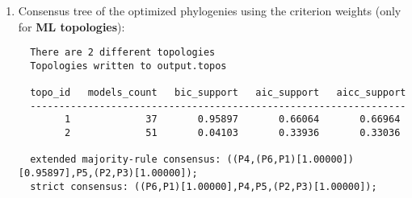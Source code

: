 \begin{enumerate}
\begin{enumerate}
\item Consensus tree of the optimized phylogenies using the criterion weights (only for {\bf ML topologies}):

\begin{lstlisting}
  There are 2 different topologies
  Topologies written to output.topos

  topo_id   models_count   bic_support   aic_support   aicc_support
  -----------------------------------------------------------------
        1             37       0.95897       0.66064       0.66964
        2             51       0.04103       0.33936       0.33036

  extended majority-rule consensus: ((P4,(P6,P1)[1.00000])[0.95897],P5,(P2,P3)[1.00000]);
  strict consensus: ((P6,P1)[1.00000],P4,P5,(P2,P3)[1.00000]);
\end{lstlisting}

\end{enumerate}
\end{enumerate}

